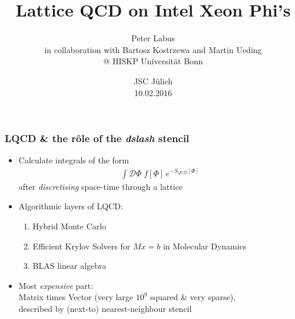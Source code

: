 \documentclass{beamer}
\begin{document}
\allowdisplaybreaks[1]

\title{Lattice QCD on Intel Xeon Phi's}
\author{Peter Labus \\[2em] {\small in collaboration with Bartosz Kostrzewa and Martin Ueding \\ @ HISKP Universität Bonn} }
  \date{JSC Jülich \\ 10.02.2016}


  \begin{frame}
    \titlepage
  \end{frame}


  \setcounter{framenumber}{0}

  \begin{frame}
    \frametitle{LQCD \& the r\^ole of the \textit{dslash} stencil}

    \begin{itemize}
      \item  Calculate integrals of the form
        \begin{align*}
          \int \mathcal D \Phi \; f[\Phi] \, e^{-S_{QCD}[\Phi]}
        \end{align*}
        after \textit{discretising} space-time through a lattice
        \vfill

      \item Algorithmic layers of LQCD:
        \begin{enumerate}
          \item Hybrid Monte Carlo
          \item Efficient Krylov Solvers for $Mx=b$ in Molecular Dynamics
          \item BLAS linear algebra
        \end{enumerate}
        \vfill

      \item Most \textit{expensive} part:\\[1mm]
        \hspace{2mm} Matrix times Vector (very large $10^9$ squared \& very sparse),\\
        \hspace{2mm} described by (next-to) nearest-neighbour stencil
        \vfill
    \end{itemize}

  \end{frame}
\end{document}

